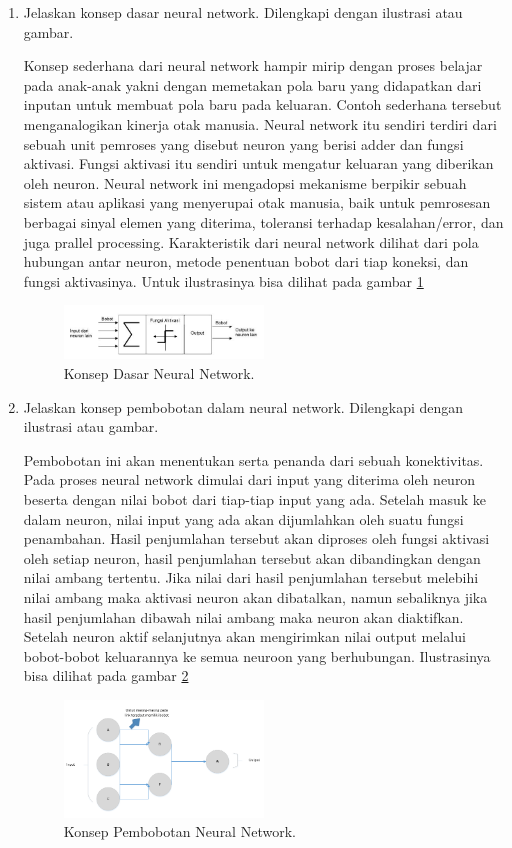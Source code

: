 \begin{enumerate}
\item Jelaskan konsep dasar neural network. Dilengkapi dengan ilustrasi atau gambar. \par
Konsep sederhana dari neural network hampir mirip dengan proses belajar pada anak-anak yakni dengan memetakan pola baru yang didapatkan dari inputan untuk membuat pola baru pada keluaran. Contoh sederhana tersebut menganalogikan kinerja otak manusia. Neural network itu sendiri terdiri dari sebuah unit pemroses yang disebut neuron yang berisi adder dan fungsi aktivasi. Fungsi aktivasi itu sendiri untuk mengatur keluaran yang diberikan oleh neuron. Neural network ini mengadopsi mekanisme berpikir sebuah sistem atau aplikasi yang menyerupai otak manusia, baik untuk pemrosesan berbagai sinyal elemen yang diterima, toleransi terhadap kesalahan/error, dan juga prallel processing. Karakteristik dari neural network dilihat dari pola hubungan antar neuron, metode penentuan bobot dari tiap koneksi, dan fungsi aktivasinya. Untuk ilustrasinya bisa dilihat pada gambar \ref{cc2}
		\begin{figure}[!htbp]
		\centerline{\includegraphics[width=0.5\textwidth]{figures/im/cc2.png}}
		\caption{Konsep Dasar Neural Network.}
		\label{cc2}
		\end{figure}

\item Jelaskan konsep pembobotan dalam neural network. Dilengkapi dengan ilustrasi atau gambar. \par
Pembobotan ini akan menentukan serta penanda dari sebuah konektivitas. Pada proses neural network dimulai dari input yang diterima oleh neuron beserta dengan nilai bobot dari tiap-tiap input yang ada. Setelah masuk ke dalam neuron, nilai input yang ada akan dijumlahkan oleh suatu fungsi penambahan. Hasil penjumlahan tersebut akan diproses oleh fungsi aktivasi oleh setiap neuron, hasil penjumlahan tersebut akan dibandingkan dengan nilai ambang tertentu. Jika nilai dari hasil penjumlahan tersebut melebihi nilai ambang maka aktivasi neuron akan dibatalkan, namun sebaliknya jika hasil penjumlahan dibawah nilai ambang maka neuron akan diaktifkan. Setelah neuron aktif selanjutnya akan mengirimkan nilai output melalui bobot-bobot keluarannya ke semua neuroon yang berhubungan. Ilustrasinya bisa dilihat pada gambar \ref{cc3}
		\begin{figure}[!htbp]
		\centerline{\includegraphics[width=0.5\textwidth]{figures/im/cc3.png}}
		\caption{Konsep Pembobotan Neural Network.}
		\label{cc3}
		\end{figure}


\end{enumerate}
